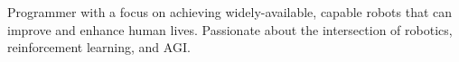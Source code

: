 
Programmer with a focus on achieving widely-available, capable robots that can improve and enhance human lives.
Passionate about the intersection of robotics, reinforcement learning, and AGI.

